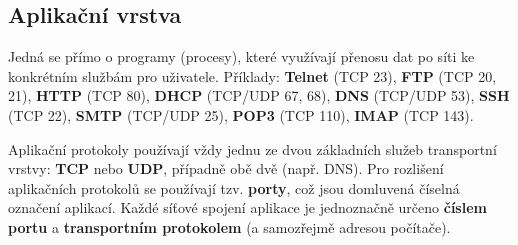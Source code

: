 \subsection{Aplikační vrstva}
Jedná se přímo o programy (procesy), které využívají přenosu dat po síti ke konkrétním službám pro uživatele. Příklady: \textbf{Telnet} (TCP 23), \textbf{FTP} (TCP 20, 21), \textbf{HTTP} (TCP 80), \textbf{DHCP} (TCP/UDP 67, 68), \textbf{DNS} (TCP/UDP 53), \textbf{SSH} (TCP 22), \textbf{SMTP} (TCP/UDP 25), \textbf{POP3} (TCP 110), \textbf{IMAP} (TCP 143).

Aplikační protokoly používají vždy jednu ze dvou základních služeb transportní vrstvy: \textbf{TCP} nebo \textbf{UDP}, případně obě dvě (např. DNS). Pro rozlišení aplikačních protokolů se používají tzv. \textbf{porty}, což jsou domluvená číselná označení aplikací. Každé síťové spojení aplikace je jednoznačně určeno \textbf{číslem portu} a \textbf{transportním protokolem} (a samozřejmě adresou počítače).